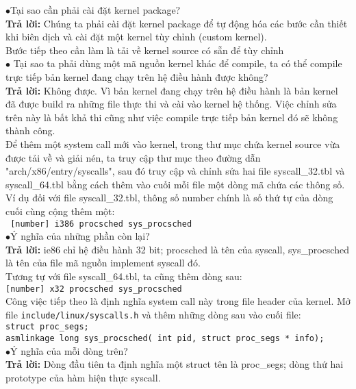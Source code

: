 \documentclass[12pt,a4paper,titlepage]{article}
\begin{document}
	$\bullet$Tại sao cần phải cài đặt kernel package?\\
	\textbf{Trả lời:} Chúng ta phải cài đặt kernel package để tự động hóa các bước cần thiết khi biên dịch và cài đặt một kernel tùy chỉnh (custom kernel).\\
	
	Bước tiếp theo cần làm là tải về kernel source có sẵn để tùy chỉnh\\
	
	$\bullet$ Tại sao ta phải dùng một mã nguồn kernel khác để compile, ta có thể compile trực tiếp bản kernel đang chạy trên hệ điều hành được không?\\
	\textbf{Trả lời:} Không được. Vì bản kernel đang chạy trên hệ điều hành là bản kernel đã được build ra những file thực thi và cài vào kernel hệ thống. Việc chỉnh sửa trên này là bất khả thi cũng như việc compile trực tiếp bản kernel đó sẽ không thành công.\\ 
	
	Để thêm một system call mới vào kernel, trong thư mục chứa kernel source vừa
	được tải về và giải nén, ta truy cập thư mục theo đường dẫn
	"arch/x86/entry/syscalls", sau đó truy cập và chỉnh sửa hai file syscall\_32.tbl
	và syscall\_64.tbl bằng cách thêm vào cuối mỗi file một dòng mã chứa các thông
	số. Ví dụ đối với file syscall\_32.tbl, thông số number chính là số thứ tự của
	dòng cuối cùng cộng thêm một:\\
	\texttt{ [number]	i386	procsched	sys\_procsched }\\
	
	$\bullet$Ý nghĩa của những phần còn lại? \\
	\textbf{Trả lời:} ie86 chỉ hệ điều hành 32 bit; procsched
	là tên của syscall, sys\_procsched là tên của file mã nguồn implement syscall
	đó.\\
	
	Tương tự với file syscall\_64.tbl, ta cũng thêm dòng sau:\\
	\texttt{[number] x32 procsched sys\_procsched}\\
	
	Công việc tiếp theo là định nghĩa system call này trong file header của kernel.
	Mở file \texttt{include/linux/syscalls.h} và thêm những dòng sau vào cuối file:
	\\
	\texttt{struct proc\_segs;}\\
	\texttt{asmlinkage long sys\_procsched( int pid, struct proc\_segs * info);}\\
	
	$\bullet$Ý nghĩa của mỗi dòng trên?\\
	\textbf{Trả lời:} Dòng đầu tiên ta định nghĩa một struct tên
	là proc\_segs; dòng thứ hai prototype của hàm hiện thực syscall.\\
	
\end{document}
